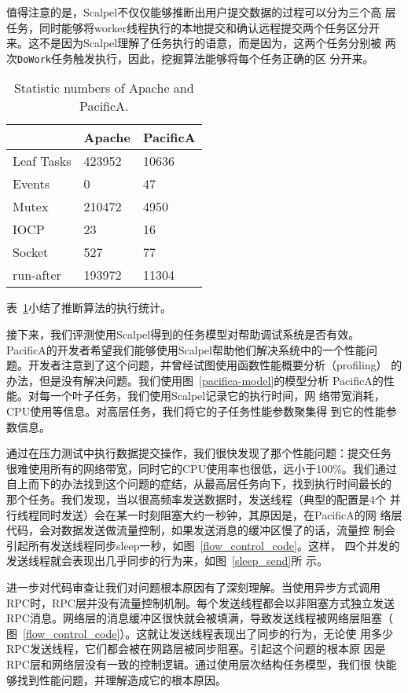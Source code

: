 值得注意的是，Scalpel不仅仅能够推断出用户提交数据的过程可以分为三个高
层任务，同时能够将worker线程执行的本地提交和确认远程提交两个任务区分开
来。这不是因为Scalpel理解了任务执行的语意，而是因为，这两个任务分别被
两次\texttt{DoWork}任务触发执行，因此，挖掘算法能够将每个任务正确的区
分开来。

\begin{table}[t!]
\small
\centering
\caption{Statistic numbers of Apache and PacificA.}
\label{scp:statistics}
\begin{tabular}{lll}

  		& Apache	& PacificA \\
\hline
Leaf Tasks	& 423952	& 10636 \\
\hline
Events		& 0			& 47 \\
Mutex 		& 210472	& 4950 \\
IOCP		& 23		& 16 \\
Socket		& 527		& 77 \\
run-after	& 193972	& 11304 \\
\hline

\end{tabular}
\end{table}

表~\ref{scp:statistics}小结了推断算法的执行统计。

接下来，我们评测使用Scalpel得到的任务模型对帮助调试系统是否有效。
PacificA的开发者希望我们能够使用Scalpel帮助他们解决系统中的一个性能问
题。开发者注意到了这个问题，并曾经试图使用函数性能概要分析（profiling）
的办法，但是没有解决问题。我们使用图~\ref{pacifica-model}的模型分析
PacificA的性能。对每一个叶子任务，我们使用Scalpel记录它的执行时间，网
络带宽消耗，CPU使用等信息。对高层任务，我们将它的子任务性能参数聚集得
到它的性能参数信息。

通过在压力测试中执行数据提交操作，我们很快发现了那个性能问题：提交任务
很难使用所有的网络带宽，同时它的CPU使用率也很低，远小于100\%。我们通过
自上而下的办法找到这个问题的症结，从最高层任务向下，找到执行时间最长的
那个任务。我们发现，当以很高频率发送数据时，发送线程（典型的配置是4个
并行线程同时发送）会在某一时刻阻塞大约一秒钟，其原因是，在PacificA的网
络层代码，会对数据发送做流量控制，如果发送消息的缓冲区慢了的话，流量控
制会引起所有发送线程同步sleep一秒，如图~\ref{flow_control_code}。这样，
四个并发的发送线程就会表现出几乎同步的行为来，如图~\ref{sleep_send}所
示。

进一步对代码审查让我们对问题根本原因有了深刻理解。当使用异步方式调用
RPC时，RPC层并没有流量控制机制。每个发送线程都会以非阻塞方式独立发送
RPC消息。网络层的消息缓冲区很快就会被填满，导致发送线程被网络层阻塞（
图~\ref{flow_control_code}）。这就让发送线程表现出了同步的行为，无论使
用多少RPC发送线程，它们都会被在网路层被同步阻塞。引起这个问题的根本原
因是RPC层和网络层没有一致的控制逻辑。通过使用层次结构任务模型，我们很
快能够找到性能问题，并理解造成它的根本原因。

